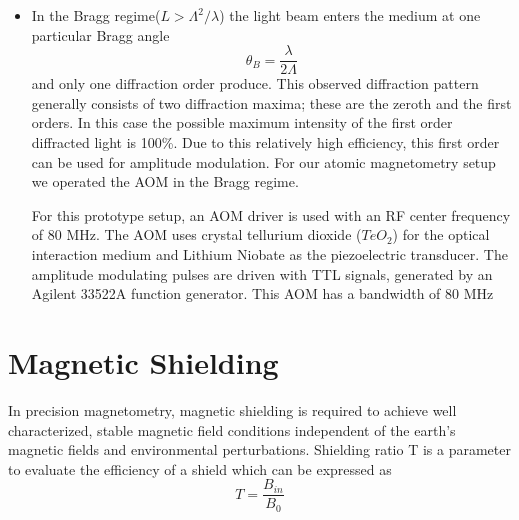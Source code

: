 \begin{itemize}
\item In the Bragg regime($L > \Lambda^2/\lambda$) the light beam enters the medium at one particular Bragg angle 
\begin{equation}
\theta_B=\frac{\lambda}{2\Lambda}
\end{equation}                                 
and only one diffraction order produce. This observed diffraction pattern generally consists of two diffraction maxima; these are the zeroth and the first orders. In this case the possible maximum intensity of the first order diffracted light is 100\%. Due to this relatively high efficiency, this first order can be used for amplitude modulation. For our atomic magnetometry setup we operated the AOM in the Bragg regime.

For this prototype setup, an AOM driver is used with an RF center frequency of 80 MHz. The AOM uses crystal tellurium dioxide ($TeO_2$) for the optical interaction medium and Lithium Niobate as the piezoelectric transducer. The amplitude modulating pulses are driven with TTL signals, generated by an Agilent 33522A function generator. This AOM has a bandwidth of 80 MHz\\


\end{itemize} 
\section{Magnetic Shielding}
In precision magnetometry, magnetic shielding is required to achieve well characterized, stable magnetic field conditions independent of the earth’s magnetic fields and environmental perturbations. Shielding ratio T is a parameter to evaluate the efficiency of a shield which can be expressed as
\begin{equation}
 T = \frac{B_{in} }{B_0} 
\end{equation}

